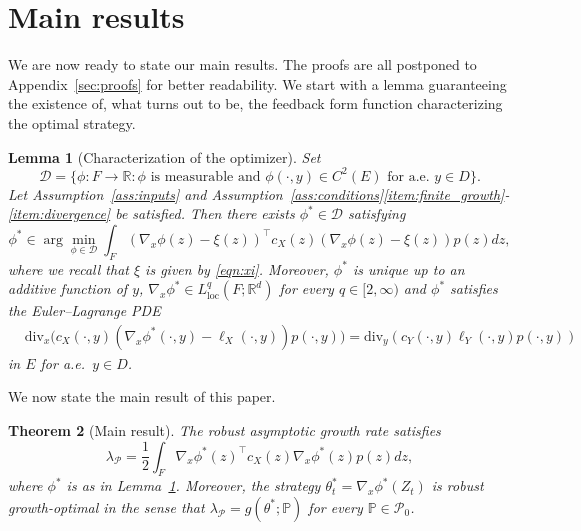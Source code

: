 \documentclass{article}
\theoremstyle{plain}
\newtheorem{lem}{Lemma}
\newtheorem{thm}[lem]{Theorem}
\theoremstyle{definition}
\newcommand{\R}{\mathbb{R}}
\renewcommand{\P}{\mathbb{P}}
\newcommand{\Dcal}{{\mathcal D}}
\newcommand{\Pcal}{{\mathcal P}}
\numberwithin{lem}{section}
\begin{document}
\section{Main results} \label{sec:main_results}


We are now ready to state our main results. The proofs are all postponed to Appendix~\ref{sec:proofs} for better readability. We start with a lemma guaranteeing the existence of, what turns out to be, the feedback form function characterizing the optimal strategy.
\begin{lem}[Characterization of the optimizer] \label{lem:variational}
Set 
    \[\Dcal = \{\phi: F \to \R: \phi \text{ is measurable and } \phi(\cdot,y) \in C^2(E) \text{ for a.e.\ } y \in D\}.\]
    Let Assumption~\ref{ass:inputs} and Assumption~\ref{ass:conditions}\ref{item:finite_growth}-\ref{item:divergence} be satisfied. Then there exists $\phi^* \in \Dcal$ satisfying
\begin{equation} \label{eqn:variational}
\phi^*  \in \arg\min_{\phi \in \Dcal} \int_F(\nabla_x \phi(z) - \xi(z))^\top c_X(z)(\nabla_x \phi(z) - \xi(z))p(z)dz,
\end{equation}
where we recall that $\xi$ is given by \eqref{eqn:xi}.
Moreover, $\phi^*$ is unique up to an additive function of $y$, $\nabla_x \phi^* \in L^q_{\mathrm{loc}}(F;\R^d)$ for every $q \in [2,\infty)$ and $\phi^*$ satisfies the Euler--Lagrange PDE 
 \begin{align}
 \label{eqn:Euler-Lagrange}
    & \mathrm{div}_x\big(c_X(\cdot,y)(\nabla_x \phi^*(\cdot,y) - \ell_X(\cdot,y)) p(\cdot,y)\big)  = \mathrm{div}_y(c_Y(\cdot,y)\ell_Y(\cdot,y)p(\cdot,y))
\end{align}
in $E$ for a.e.\ $y \in D$.
\end{lem}

We now state the main result of this paper.
\begin{thm}[Main result] \label{thm:main}  The robust asymptotic growth rate satisfies
\begin{equation} \label{eqn:lambda_P_thm}
    \lambda_\Pcal  = \frac{1}{2}\int_F \nabla_x \phi^*(z)^\top c_X(z)\nabla_x \phi^*(z)p(z)dz, 
\end{equation}
where $\phi^*$ is as in Lemma~\ref{lem:variational}. 
Moreover, the strategy $\theta^*_t = \nabla_x \phi^*(Z_t)$ is robust growth-optimal in the sense that $\lambda_{\Pcal} = g(\theta^*;\P)$ for every $\P \in \Pcal_0$.    
\end{thm}
\end{document}
